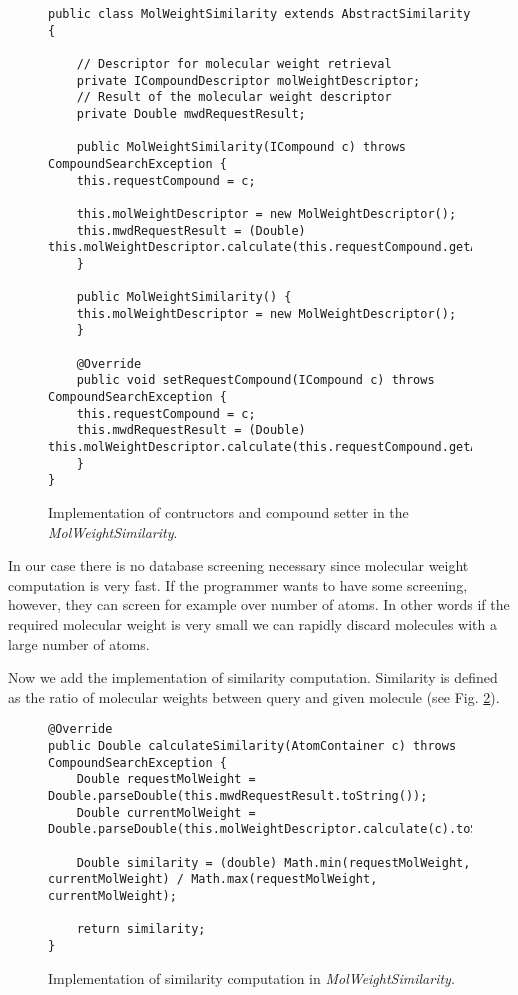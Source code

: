 \documentclass[thesis=M,english]{FITthesis}[2012/10/20]
\begin{document}
\begin{figure}
\begin{lstlisting}
public class MolWeightSimilarity extends AbstractSimilarity {

    // Descriptor for molecular weight retrieval
    private ICompoundDescriptor molWeightDescriptor;
    // Result of the molecular weight descriptor
    private Double mwdRequestResult;

    public MolWeightSimilarity(ICompound c) throws CompoundSearchException {
	this.requestCompound = c;

	this.molWeightDescriptor = new MolWeightDescriptor();
	this.mwdRequestResult = (Double) this.molWeightDescriptor.calculate(this.requestCompound.getAtomContainer());
    }

    public MolWeightSimilarity() {
	this.molWeightDescriptor = new MolWeightDescriptor();
    }

    @Override
    public void setRequestCompound(ICompound c) throws CompoundSearchException {
	this.requestCompound = c;
	this.mwdRequestResult = (Double) this.molWeightDescriptor.calculate(this.requestCompound.getAtomContainer());
    }
}

\end{lstlisting}
\caption{Implementation of contructors and compound setter in the \textit{MolWeightSimilarity}.}
\label{MolWeightSimilarity1}
\end{figure}

In our case there is no database screening necessary since molecular weight computation is very fast. If the programmer wants to have some screening, however, they can screen for example over number of atoms. In other words if the required molecular weight is very small we can rapidly discard molecules with a large number of atoms.

Now we add the implementation of similarity computation. Similarity is defined as the ratio of molecular weights between query and given molecule (see Fig. \ref{MolWeightSimilarity2}).

\begin{figure}
\begin{lstlisting}
@Override
public Double calculateSimilarity(AtomContainer c) throws CompoundSearchException {
    Double requestMolWeight = Double.parseDouble(this.mwdRequestResult.toString());
    Double currentMolWeight = Double.parseDouble(this.molWeightDescriptor.calculate(c).toString());

    Double similarity = (double) Math.min(requestMolWeight, currentMolWeight) / Math.max(requestMolWeight, currentMolWeight);

    return similarity;
}
\end{lstlisting}
\caption{Implementation of similarity computation in \textit{MolWeightSimilarity}.}
\label{MolWeightSimilarity2}
\end{figure}
\end{document}
